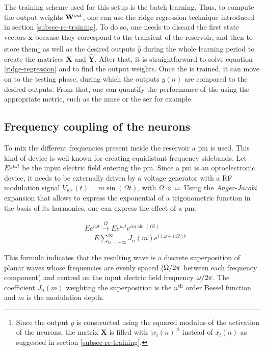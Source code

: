 The training scheme used for this setup is the batch learning. Thus, to compute the output weights $\mathbf{W}^{\text{out}}$, one can use the ridge regression technique introduced in section \ref{subsec-rc-training}. To do so, one needs to discard the first state vectors $\mathbf{x}$ because they correspond to the transient of the reservoir, and then to store them\footnote{Since the output $y$ is constructed using the squared modulus of the activation of the neurons, the matrix $\mathbf{X}$ is filled with $|x_i(n)|^2$ instead of $x_i(n)$ as suggested in section \ref{subsec-rc-training}.} as well as the desired outputs $\hat{y}$ during the whole learning period to create the matrices $\mathbf{X}$ and $\hat{\mathbf{Y}}$. After that, it is straightforward to solve equation \eqref{ridge-regression} and to find the output weights. Once the \rcer is trained, it can move on to the testing phase, during which the outputs $y(n)$ are compared to the desired outputs. From that, one can quantify the performance of the \rcer using the appropriate metric, such as the \gls{nmse} or the \gls{ser} for example.


\subsection{Frequency coupling of the neurons}

\label{subsec-freq-coupling}

To mix the different frequencies present inside the reservoir a \gls{pm} is used. This kind of device is well known for creating equidistant frequency sidebands. Let $Ee^{i\omega t}$ be the input electric field entering the \gls{pm}. Since a \gls{pm} is an optoelectronic device, it needs to be externally driven by a voltage generator with a RF modulation signal $V_{\text{RF}}(t) = m \sin{(\Omega t)}$, with $\Omega \ll \omega$. Using the \textit{Anger-Jacobi} expansion that allows to express the exponential of a trigonometric function in the basis of its harmonics, one can express the effect of a \gls{pm}:

\begin{align}
	&Ee^{i\omega t} \overset{\Omega}{\longrightarrow} Ee^{i\omega t}e^{im\sin{(\Omega t)}} \nonumber \\
	& = E \sum_{n=-\infty}^{\infty} J_n(m) e^{i(\omega+n\Omega)t} \label{tf-pm}
\end{align}

This formula indicates that the resulting wave is a discrete superposition of planar waves whose frequencies are evenly spaced ($\Omega/2\pi$ between each frequency component) and centred on the input electric field frequency $\omega/2\pi$. The coefficient $J_n(m)$ weighting the superposition is the $n^{\text{th}}$ order Bessel function and $m$ is the modulation depth.\\

